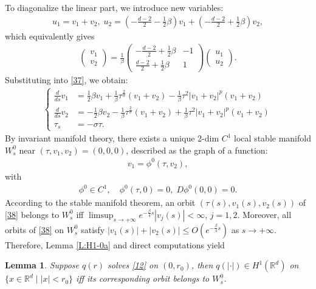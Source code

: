 \documentclass[12pt]{amsart}
\newcommand{\R}{\mathbb R}
\newtheorem{lemma}[theorem]{Lemma}
\begin{document}
To diagonalize the linear part, we introduce new variables: 
\begin{align}\label{36}
u_1=v_1+v_2, \; u_2=(-\tfrac{d-2}2-\tfrac 12\beta)v_1+(-\tfrac{d-2}2+\tfrac 12\beta)v_2,
\end{align}
which equivalently gives
\begin{align}\label{37}
\begin{pmatrix}v_1\\ v_2\end{pmatrix}=\frac 1\beta\begin{pmatrix}-\tfrac{d-2}2+\tfrac 12\beta&-1\\
\tfrac{d-2}2+\tfrac 12 \beta&1\end{pmatrix}
\begin{pmatrix}u_1\\u_2\end{pmatrix}.
\end{align}
Substituting into \eqref{37}, we obtain:
\begin{align}\label{38}
\begin{cases}
\tfrac d{ds}v_1&=\tfrac 12\beta v_1+\tfrac 1\beta \tau^{\frac 2\sigma}(v_1+v_2)-\tfrac 1\beta \tau^2|v_1+v_2|^{p}(v_1+v_2)\\
\tfrac d{ds}v_2&=-\tfrac 12\beta v_2-\tfrac 1\beta \tau^{\frac 2\sigma}(v_1+v_2)+\tfrac 1\beta \tau^2|v_1+v_2|^{p}(v_1+v_2)\\
\tau_s&=-\sigma \tau. 
\end{cases}
\end{align}
By invariant manifold theory, there exists a unique 2-dim $C^1$ local stable manifold $W_s^0$ near $(\tau, v_1,v_2)=(0,0,0)$, described as the graph of a function:
\begin{align}\label{39}
v_1=\phi^0(\tau, v_2), 
\end{align}
with
\begin{align}\label{40}
\phi^0\in C^1, \quad \phi^0(\tau, 0)=0, \; D \phi^0(0, 0)=0. 
\end{align}
According to the stable manifold theorem, an orbit $(\tau (s), v_1(s), v_2(s))$ of \eqref{38} belongs to $W_s^0$ iff $\limsup_{s \to +\infty} e^{-\frac \beta4 s} |v_j(s)| < \infty$,  $j=1, 2$. 
Moreover, all orbits of \eqref{38} on $W_s^0$ satisfy $|v_1(s)| + |v_2(s)| \le O(e^{-\frac \beta4 s})$ as $ s\to +\infty$. Therefore, Lemma \ref{L:H1-0a} and direct computations yield 

\begin{lemma} \label{L:H1-0b}
Suppose $q(r)$ solves \eqref{12} on $(0, r_0)$, then $q(|\cdot|) \in H^1(\R^d)$ on $ \{x \in \R^d \mid |x| < r_0\}$ iff its corresponding orbit belongs to $W_s^0$.
\end{lemma}
\end{document}
